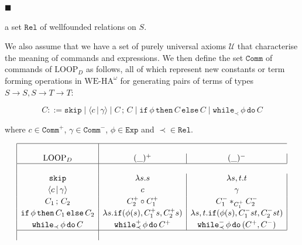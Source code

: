  
 
\par\noindent  $\blacksquare$ 
 
a set $\mathtt{Rel}$ of wellfounded relations on $S$.\par
 
 
  
 
 
We also assume that we have a set of purely universal axioms $\mathcal{U}$ that characterise the meaning of commands and expressions. We then define the set $\mathtt{Comm}$ of commands of $\mathrm{LOOP}_{D}$ as follows, all of which represent new constants or term forming operations in $\mathrm{WE}\mbox{-}\mathrm{HA}^{\omega}$ for generating pairs of terms of types $S\to S,S\to T\to T$:\par
  
\par  \quad  \[C::=\mathtt{skip}\mid\langle{c}\,|\,{\gamma}\rangle\mid{C}\,;\,{C}\mid\mathtt{if}\,{\phi}\,\mathtt{then}\,{C}\,\mathtt{else}\,{C}\mid\mathtt{while}_{\prec}\,{\phi}\,\mathtt{do}\,{C}\]\quad  \quad  
  
where $c\in\mathtt{Comm}^{+}$, $\gamma\in\mathtt{Comm}^{-}$, $\phi\in\mathtt{Exp}$ and $\prec\in\mathtt{Rel}$.\par
 
 
   
\par  \quad  \[\begin{array}[]{|c|c|c|}\hline\cr\mathrm{LOOP}_{D}&(\_)^{+}&(\_)^{-}\\
\hline\cr\mathtt{skip}&\lambda s.s&\lambda s,t.t\\[1.99168pt]
\langle{c}\,|\,{\gamma}\rangle&c&\gamma\\[1.99168pt]
{C_{1}}\,;\,{C_{2}}&C_{2}^{+}\circ C_{1}^{+}&C_{1}^{-}\ast_{C_{1}^{+}}C_{2}^{-}\\[1.99168pt]
\mathtt{if}\,{\phi}\,\mathtt{then}\,{C_{1}}\,\mathtt{else}\,{C_{2}}&\lambda s.\mathtt{if}({\phi(s)},{C^{+}_{1}s},{C^{+}_{2}s})&\lambda s,t.\mathtt{if}({\phi(s)},{C^{-}_{1}st},{C^{-}_{2}st})\\[1.99168pt]
\mathtt{while}_{\prec}\,{\phi}\,\mathtt{do}\,{C}&\mathtt{while}^{+}_{\prec}\,{\phi}\,\mathtt{do}\,{C^{+}}&\mathtt{while}^{-}_{\prec}\,{\phi}\,\mathtt{do}\,{(C^{+},C^{-})}\\
\hline\cr\end{array}\]\quad  \quad  
   

